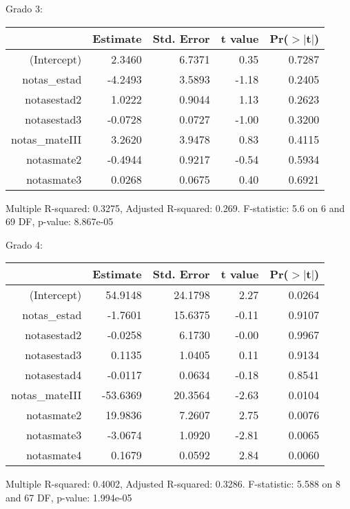 \documentclass[11pt]{article}
\begin{document}
Grado 3:
\begin{center}
\begin{table}[ht]
\centering
\begin{tabular}{rrrrr}
  \hline
 & Estimate & Std. Error & t value & Pr($>$$|$t$|$) \\ 
  \hline
(Intercept) & 2.3460 & 6.7371 & 0.35 & 0.7287 \\ 
  notas\_estad & -4.2493 & 3.5893 & -1.18 & 0.2405 \\ 
  notasestad2 & 1.0222 & 0.9044 & 1.13 & 0.2623 \\ 
  notasestad3 & -0.0728 & 0.0727 & -1.00 & 0.3200 \\ 
  notas\_mateIII & 3.2620 & 3.9478 & 0.83 & 0.4115 \\ 
  notasmate2 & -0.4944 & 0.9217 & -0.54 & 0.5934 \\ 
  notasmate3 & 0.0268 & 0.0675 & 0.40 & 0.6921 \\ 
   \hline
\end{tabular}
\end{table}
\tiny{Multiple R-squared: 0.3275, Adjusted R-squared: 0.269.
F-statistic: 5.6 on 6 and 69 DF, p-value: 8.867e-05}
\end{center}

Grado 4:
\begin{center}
\begin{table}[ht]
\centering
\begin{tabular}{rrrrr}
  \hline
 & Estimate & Std. Error & t value & Pr($>$$|$t$|$) \\ 
  \hline
(Intercept) & 54.9148 & 24.1798 & 2.27 & 0.0264 \\ 
  notas\_estad & -1.7601 & 15.6375 & -0.11 & 0.9107 \\ 
  notasestad2 & -0.0258 & 6.1730 & -0.00 & 0.9967 \\ 
  notasestad3 & 0.1135 & 1.0405 & 0.11 & 0.9134 \\ 
  notasestad4 & -0.0117 & 0.0634 & -0.18 & 0.8541 \\ 
  notas\_mateIII & -53.6369 & 20.3564 & -2.63 & 0.0104 \\ 
  notasmate2 & 19.9836 & 7.2607 & 2.75 & 0.0076 \\ 
  notasmate3 & -3.0674 & 1.0920 & -2.81 & 0.0065 \\ 
  notasmate4 & 0.1679 & 0.0592 & 2.84 & 0.0060 \\ 
   \hline
\end{tabular}
\end{table}

\tiny{Multiple R-squared:  0.4002, Adjusted R-squared: 0.3286.
F-statistic: 5.588 on 8 and 67 DF, p-value:  1.994e-05}

\end{center}
\end{document}
